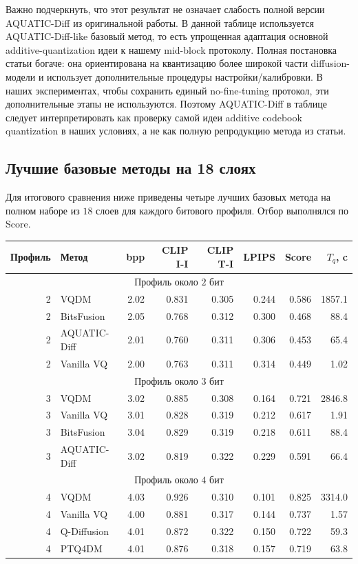 \documentclass[a4paper,12pt]{article}
\begin{document}
Важно подчеркнуть, что этот результат не означает слабость полной версии AQUATIC-Diff из оригинальной работы. В данной таблице используется AQUATIC-Diff-like базовый метод, то есть упрощенная адаптация основной additive-quantization идеи к нашему mid-block протоколу. Полная постановка статьи богаче: она ориентирована на квантизацию более широкой части diffusion-модели и использует дополнительные процедуры настройки/калибровки. В наших экспериментах, чтобы сохранить единый no-fine-tuning протокол, эти дополнительные этапы не используются. Поэтому AQUATIC-Diff в таблице следует интерпретировать как проверку самой идеи additive codebook quantization в наших условиях, а не как полную репродукцию метода из статьи.

\subsection{Лучшие базовые методы на 18 слоях}

Для итогового сравнения ниже приведены четыре лучших базовых метода на полном наборе из $18$ слоев для каждого битового профиля. Отбор выполнялся по Score.

\begin{center}
\small
\begin{tabular}{rlrrrrrr}
\hline
Профиль & Метод & bpp & CLIP I-I & CLIP T-I & LPIPS & Score & $T_q$, c \\
\hline
\multicolumn{8}{c}{Профиль около $2$ бит} \\
\hline
2 & VQDM & 2.02 & 0.831 & 0.305 & 0.244 & 0.586 & 1857.1 \\
2 & BitsFusion & 2.05 & 0.768 & 0.312 & 0.300 & 0.468 & 88.4 \\
2 & AQUATIC-Diff & 2.01 & 0.760 & 0.311 & 0.306 & 0.453 & 65.4 \\
2 & Vanilla VQ & 2.00 & 0.763 & 0.311 & 0.314 & 0.449 & 1.02 \\
\hline
\multicolumn{8}{c}{Профиль около $3$ бит} \\
\hline
3 & VQDM & 3.02 & 0.885 & 0.308 & 0.164 & 0.721 & 2846.8 \\
3 & Vanilla VQ & 3.01 & 0.828 & 0.319 & 0.212 & 0.617 & 1.91 \\
3 & BitsFusion & 3.04 & 0.829 & 0.319 & 0.218 & 0.611 & 88.4 \\
3 & AQUATIC-Diff & 3.02 & 0.819 & 0.322 & 0.229 & 0.591 & 66.4 \\
\hline
\multicolumn{8}{c}{Профиль около $4$ бит} \\
\hline
4 & VQDM & 4.03 & 0.926 & 0.310 & 0.101 & 0.825 & 3314.0 \\
4 & Vanilla VQ & 4.00 & 0.881 & 0.317 & 0.144 & 0.737 & 1.57 \\
4 & Q-Diffusion & 4.01 & 0.872 & 0.322 & 0.150 & 0.722 & 59.3 \\
4 & PTQ4DM & 4.01 & 0.876 & 0.318 & 0.157 & 0.719 & 63.8 \\
\hline
\end{tabular}
\end{center}
\end{document}

